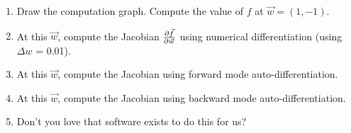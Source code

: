 \documentclass[11pt,english]{article}
\begin{document}
\begin{enumerate}[resume]
\begin{enumerate}
\item Draw the computation graph. Compute the value of $f$ at $\vec{w} = (1, -1)$.
\item At this $\vec{w}$, compute the Jacobian $\frac{\partial \vec{f}} {\partial \vec{w}}$ using numerical differentiation (using $\Delta w$ = 0.01).
\item At this $\vec{w}$, compute the Jacobian using forward mode auto-differentiation.
\item At this $\vec{w}$, compute the Jacobian using backward mode auto-differentiation.
\item Don't you love that software exists to do this for us?
\end{enumerate}

\end{enumerate}








\end{document}
